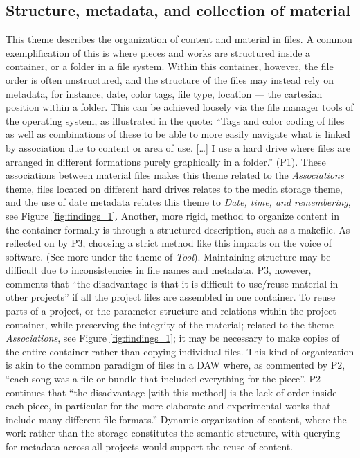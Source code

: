 \documentclass[runningheads,a4paper]{cmmr2023}
\begin{document}
\subsection{Structure, metadata, and collection of material}
\label{sec:structure}
This theme describes the organization of content and material in files. A common exemplification of this is where pieces and works are structured inside a container, or a folder in a file system. Within this container, however, the file order is often unstructured, and the structure of the files may instead rely on metadata, for instance, date, color tags, file type, location --- the cartesian position within a folder. This can be achieved loosely via the file manager tools of the operating system, as illustrated in the quote:  “Tags and color coding of files as well as combinations of these to be able to more easily navigate what is linked by association due to content or area of use. […] I use a hard drive where files are arranged in different formations purely graphically in a folder.” (P1). These associations between material files makes this theme related to the \emph{Associations} theme, files located on different hard drives relates to the media storage theme, and the use of date metadata relates this theme to \emph{Date, time, and remembering}, see Figure \ref{fig:findings_1}. Another, more rigid, method to organize content in the container formally is through a structured description, such as a makefile. As reflected on by P3, choosing a strict method like this impacts on the voice of software. (See more under the theme of \emph{Tool}). Maintaining structure may be difficult due to inconsistencies in file names and metadata. P3, however, comments that “the disadvantage is that it is difficult to use/reuse material in other projects” if all the project files are assembled in one container. To reuse parts of a project, or the parameter structure and relations within the project container, while preserving the integrity of the material; related to the theme \emph{Associations}, see Figure \ref{fig:findings_1}; it may be necessary to make copies of the entire container rather than copying individual files. This kind of organization is akin to the common paradigm of files in a DAW where, as commented by P2, “each song was a file or bundle that included everything for the piece”. P2 continues that “the disadvantage [with this method] is the lack of order inside each piece, in particular for the more elaborate and experimental works that include many different file formats.” Dynamic organization of content, where the work rather than the storage constitutes the semantic structure, with querying for metadata across all projects would support the reuse of content.
\end{document}
